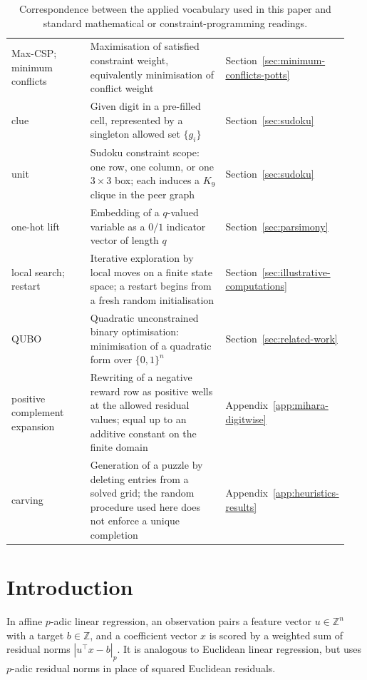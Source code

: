 \documentclass[11pt]{article}
\begin{document}
\begin{table}[t!]
\begin{tabular}{@{}p{0.27\linewidth}p{0.54\linewidth}p{0.13\linewidth}@{}}
Max-CSP; minimum conflicts & Maximisation of satisfied constraint weight, equivalently minimisation of conflict weight & Section~\ref{sec:minimum-conflicts-potts} \\
clue & Given digit in a pre-filled cell, represented by a singleton allowed set \(\{g_i\}\) & Section~\ref{sec:sudoku} \\
unit & Sudoku constraint scope: one row, one column, or one \(3\times3\) box; each induces a \(K_9\) clique in the peer graph & Section~\ref{sec:sudoku} \\
one-hot lift & Embedding of a \(q\)-valued variable as a \(0/1\) indicator vector of length \(q\) & Section~\ref{sec:parsimony} \\
local search; restart & Iterative exploration by local moves on a finite state space; a restart begins from a fresh random initialisation & Section~\ref{sec:illustrative-computations} \\
QUBO & Quadratic unconstrained binary optimisation: minimisation of a quadratic form over \(\{0,1\}^n\) & Section~\ref{sec:related-work} \\
\parbox[t]{\linewidth}{\raggedright positive complement\\expansion} & Rewriting of a negative reward row as positive wells at the allowed residual values; equal up to an additive constant on the finite domain & Appendix~\ref{app:mihara-digitwise} \\
carving & Generation of a puzzle by deleting entries from a solved grid; the random procedure used here does not enforce a unique completion & Appendix~\ref{app:heuristics-results} \\
\bottomrule
\end{tabular}
\caption{Correspondence between the applied vocabulary used in this paper and standard mathematical or constraint-programming readings.}
\label{tab:terminology}
\end{table}


\section{Introduction}
\label{sec:introduction}

In affine \(p\)-adic linear regression, an observation pairs a feature vector \(u\in\mathbb Z^n\) with a target \(b\in\mathbb Z\), and a coefficient vector \(x\) is scored by a weighted sum of residual norms \(|u^\top x-b|_p\). It is analogous to Euclidean linear regression, but uses \(p\)-adic residual norms in place of squared Euclidean residuals.
\end{document}
